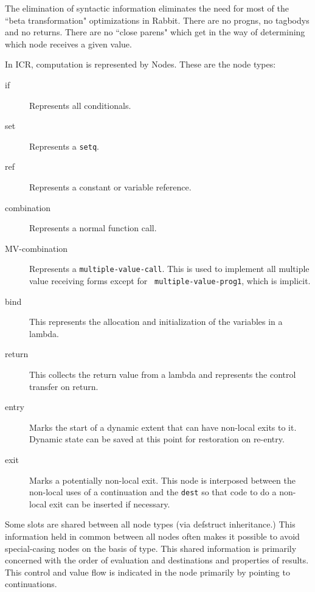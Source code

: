 The elimination of syntactic information eliminates the need for most of the
``beta transformation" optimizations in Rabbit.  There are no progns, no
tagbodys and no returns.  There are no ``close parens" which get in the way of
determining which node receives a given value.

In ICR, computation is represented by Nodes.  These are the node types:
\begin{description}
\item[if]  Represents all conditionals.

\item[set] Represents a {\tt setq}.

\item[ref] Represents a constant or variable reference.

\item[combination] Represents a normal function call.

\item[MV-combination] Represents a {\tt multiple-value-call}.  This is used to
implement all multiple value receiving forms except for {\tt
multiple-value-prog1}, which is implicit.

\item[bind]
This represents the allocation and initialization of the variables in
a lambda.

\item[return]
This collects the return value from a lambda and represents the
control transfer on return.

\item[entry] Marks the start of a dynamic extent that can have non-local exits
to it.  Dynamic state can be saved at this point for restoration on re-entry.

\item[exit] Marks a potentially non-local exit.  This node is interposed
between the non-local uses of a continuation and the {\tt dest} so that code to
do a non-local exit can be inserted if necessary.
\end{description}

Some slots are shared between all node types (via defstruct inheritance.)  This
information held in common between all nodes often makes it possible to avoid
special-casing nodes on the basis of type.  This shared information is
primarily concerned with the order of evaluation and destinations and
properties of results.  This control and value flow is indicated in the node
primarily by pointing to continuations.


